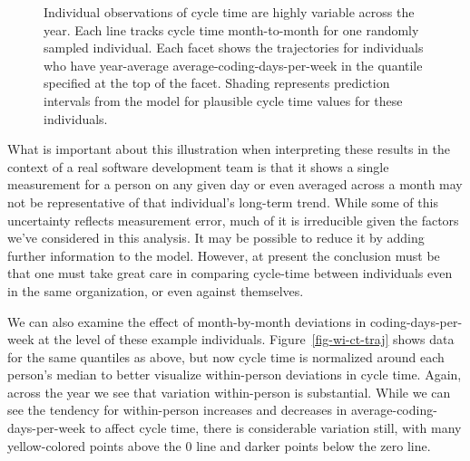 \documentclass[manuscript,screen,review]{acmart}
\begin{document}
\begin{figure}


\caption[Individual observations of cycle time are highly variable
across the year]{\label{fig-bw-ct-traj}Individual observations of cycle
time are highly variable across the year. Each line tracks cycle time
month-to-month for one randomly sampled individual. Each facet shows the
trajectories for individuals who have year-average
average-coding-days-per-week in the quantile specified at the top of the
facet. Shading represents prediction intervals from the model for
plausible cycle time values for these individuals.}

\end{figure}%

What is important about this illustration when interpreting these
results in the context of a real software development team is that it
shows a single measurement for a person on any given day or even
averaged across a month may not be representative of that individual's
long-term trend. While some of this uncertainty reflects measurement
error, much of it is irreducible given the factors we've considered in
this analysis. It may be possible to reduce it by adding further
information to the model. However, at present the conclusion must be
that one must take great care in comparing cycle-time between
individuals even in the same organization, or even against themselves.

We can also examine the effect of month-by-month deviations in
coding-days-per-week at the level of these example individuals.
Figure~\ref{fig-wi-ct-traj} shows data for the same quantiles as above,
but now cycle time is normalized around each person's median to better
visualize within-person deviations in cycle time. Again, across the year
we see that variation within-person is substantial. While we can see the
tendency for within-person increases and decreases in
average-coding-days-per-week to affect cycle time, there is considerable
variation still, with many yellow-colored points above the 0 line and
darker points below the zero line.
\end{document}
